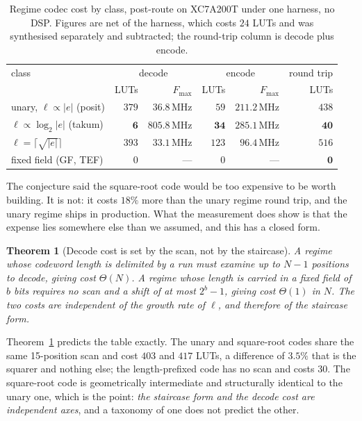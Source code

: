 \documentclass[11pt]{article}
\newtheorem{theorem}{Theorem}
\theoremstyle{definition}
\begin{document}
\begin{table}[t]\centering
\caption{Regime codec cost by class, post-route on XC7A200T under one harness,
no DSP. Figures are net of the harness, which costs $24$ LUTs and was synthesised
separately and subtracted; the round-trip column is decode plus encode.}
\label{tab:regimecost}
\begin{tabular}{lrrrrr}
\toprule
class & \multicolumn{2}{c}{decode} & \multicolumn{2}{c}{encode} & round trip \\
      & LUTs & $F_{\max}$ & LUTs & $F_{\max}$ & LUTs \\
\midrule
unary, $\ell \propto |e|$ (posit)          & $379$ & $36.8$\,MHz  & $59$  & $211.2$\,MHz & $438$ \\
$\ell \propto \log_2|e|$ (takum)           & $\mathbf{6}$ & $\mathbf{805.8}$\,MHz & $\mathbf{34}$ & $\mathbf{285.1}$\,MHz & $\mathbf{40}$ \\
$\ell = \lceil\sqrt{|e|}\rceil$            & $393$ & $33.1$\,MHz  & $123$ & $96.4$\,MHz  & $516$ \\
\midrule
fixed field (GF, TEF)                     & $0$   & ---          & $0$   & ---          & $\mathbf{0}$ \\
\bottomrule
\end{tabular}
\end{table}

The conjecture said the square-root code would be too expensive to be worth
building. It is not: it costs $18\%$ more than the unary regime round trip, and
the unary regime ships in production. What the measurement does show is that the
expense lies somewhere else than we assumed, and this has a closed form.

\begin{theorem}[Decode cost is set by the scan, not by the staircase]
\label{thm:scan}
A regime whose codeword length is delimited by a run must examine up to $N-1$
positions to decode, giving cost $\Theta(N)$. A regime whose length is carried in
a fixed field of $b$ bits requires no scan and a shift of at most $2^{b}-1$,
giving cost $\Theta(1)$ in $N$. The two costs are independent of the growth rate
of $\ell$, and therefore of the staircase form.
\end{theorem}

Theorem~\ref{thm:scan} predicts the table exactly. The unary and square-root codes
share the same 15-position scan and cost $403$ and $417$ LUTs, a difference of
$3.5\%$ that is the squarer and nothing else; the length-prefixed code has no scan
and costs $30$. The square-root code is geometrically intermediate and structurally
identical to the unary one, which is the point: \emph{the staircase form and the
decode cost are independent axes}, and a taxonomy of one does not predict the
other.
\end{document}
